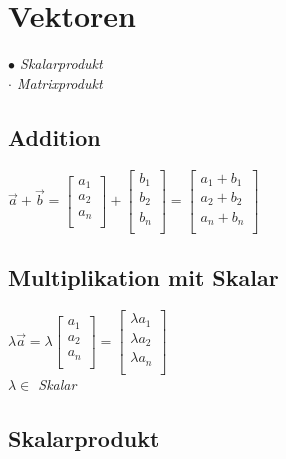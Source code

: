 \section{Vektoren}

\textit{$\bullet$ Skalarprodukt} \\
\textit{$\cdot$ Matrixprodukt}

\subsection{Addition}

$\vec{a} + \vec{b} = \begin{bmatrix}
    a_1 \\
    a_2 \\
    a_n \\
\end{bmatrix} + \begin{bmatrix}
    b_1 \\
    b_2 \\
    b_n \\
\end{bmatrix} = \begin{bmatrix}
    a_1 + b_1 \\
    a_2 + b_2 \\
    a_n + b_n \\
\end{bmatrix}$

\subsection{Multiplikation mit Skalar}

$\lambda \vec{a} = \lambda\begin{bmatrix}
    a_1 \\
    a_2 \\
    a_n \\
\end{bmatrix} = \begin{bmatrix}
    \lambda a_1 \\
    \lambda a_2 \\
    \lambda a_n \\
\end{bmatrix}$ \\

\textit{$\lambda \in$ Skalar}

\subsection{Skalarprodukt}

